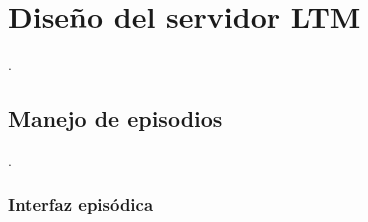 

\section{Diseño del servidor LTM}
.


\subsection{Manejo de episodios}
.

\subsubsection{Interfaz episódica}


